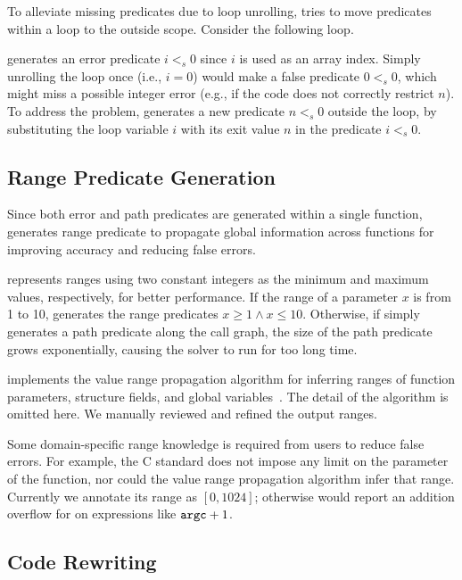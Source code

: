 To alleviate missing predicates due to loop unrolling,
\sys tries to move predicates within a loop to the outside scope.
Consider the following loop.

\sys generates an error predicate $i <_s 0$ since $i$ is used
as an array index.  Simply unrolling the loop once (i.e., $i = 0$)
would make a false predicate $0 <_s 0$, which might miss a possible
integer error (e.g., if the code does not correctly restrict $n$).
To address the problem, \sys generates a new predicate $n <_s 0$
outside the loop, by substituting the loop variable $i$ with its
exit value $n$ in the predicate $i <_s 0$.

\subsection{Range Predicate Generation}
\label{s:gen:range}

Since both error and path predicates are generated within a single
function, \sys generates range predicate to propagate global
information across functions for improving accuracy and reducing
false errors.

\sys represents ranges using two constant integers as the minimum
and maximum values, respectively, for better performance.  If the
range of a parameter $x$ is from 1 to 10, \sys generates the range
predicates $x \geq 1 \land x \leq 10$.
Otherwise, if \sys simply
generates a path predicate along the call graph, the size of the
path predicate grows exponentially, causing the solver to run for
too long time.

\sys implements the value range propagation algorithm for inferring
ranges of function parameters, structure fields, and global
variables~\cite{patterson:vrp}.  The detail of the algorithm is
omitted here.  We manually reviewed and refined the
output ranges.

Some domain-specific range knowledge is required from users to
reduce false errors.  For example, the C standard does not impose
any limit on the  parameter of the  function, nor
could the value range propagation algorithm infer that range.
Currently we annotate its range as $[0, 1024]$; otherwise \sys would
report an addition overflow for on expressions like $\texttt{argc} + 1$.



\subsection{Code Rewriting}
\label{s:gen:opt}

